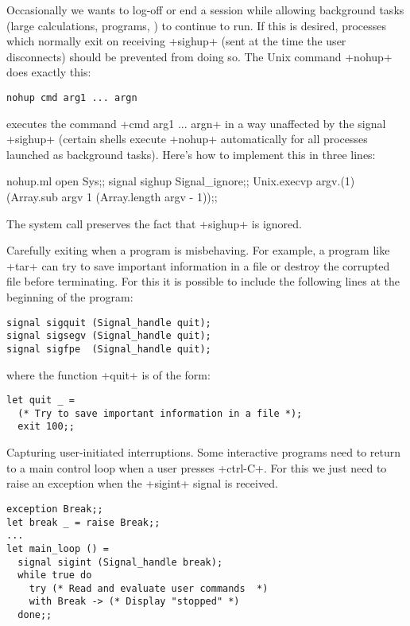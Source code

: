 \begin{example}
Occasionally we wants to log-off or end a session while allowing 
background tasks (large calculations,  programs, \etc) 
to continue to run.  If this is desired, processes which normally
exit on receiving \ml+sighup+ (sent at the time the user disconnects)
should be prevented from doing so. The Unix command \ml+nohup+ does
exactly this:
\begin{lstlisting}
nohup cmd arg1 ... argn
\end{lstlisting}
executes the command \ml+cmd arg1 ... argn+ in a way unaffected by
the signal \ml+sighup+ (certain shells execute \ml+nohup+
automatically for all processes launched as background tasks).  Here's how
to implement this in three lines:
%
\begin{listingcodefile}{nohup.ml}
open Sys;;
signal sighup Signal_ignore;;
Unix.execvp argv.(1) (Array.sub argv 1 (Array.length argv - 1));;
\end{listingcodefile}
%
The system call  preserves the fact that
\ml+sighup+ is ignored.
\end{example}

\begin{example} 
Carefully exiting when a program is misbehaving. For example,
a program like \ml+tar+ can try to save important information
in a file or destroy the corrupted file before terminating.  For this 
it is possible to include the following lines at the beginning of the program:
%
\begin{lstlisting}
signal sigquit (Signal_handle quit);
signal sigsegv (Signal_handle quit);
signal sigfpe  (Signal_handle quit);
\end{lstlisting}
%
where the function \ml+quit+ is of the form:
%
\begin{lstlisting}
let quit _ =
  (* Try to save important information in a file *);
  exit 100;;
\end{lstlisting}
\end{example}

\begin{example} 
Capturing user-initiated interruptions. Some interactive programs
need to return to a main control loop when a user
presses \ml+ctrl-C+.  For this we just need to raise an exception when the
\ml+sigint+ signal is received.
%
\begin{lstlisting}
exception Break;;
let break _ = raise Break;;
...
let main_loop () =
  signal sigint (Signal_handle break);
  while true do
    try (* Read and evaluate user commands  *)
    with Break -> (* Display "stopped" *)
  done;;
\end{lstlisting}
\end{example}

